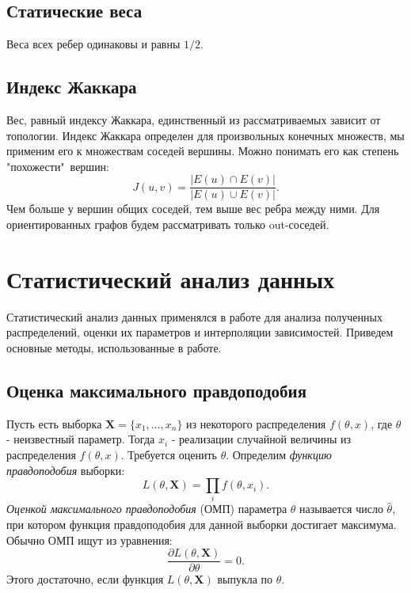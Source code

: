 \subsection{Статические веса}
Веса всех ребер одинаковы и равны $1/2$.

\subsection{Индекс Жаккара}
Вес, равный индексу Жаккара, единственный из рассматриваемых зависит от топологии. Индекс Жаккара определен для произвольных конечных множеств, мы применим его к множествам соседей вершины. Можно понимать его как степень "похожести"\ вершин:
\begin{equation}
J(u,v)=\frac{|E(u)\cap E(v)|}{|E(u)\cup E(v)|}.
\end{equation}
Чем больше у вершин общих соседей, тем выше вес ребра между ними. Для ориентированных графов будем рассматривать только out-соседей.


\section{Статистический анализ данных}
Статистический анализ данных применялся в работе для анализа полученных распределений, оценки их параметров и интерполяции зависимостей. Приведем основные методы, использованные в работе.

\subsection{Оценка максимального правдоподобия}
Пусть есть выборка $\mathbf{X}=\{x_1,\dots, x_n\}$ из некоторого распределения $f(\theta, x)$, где $\theta$ - неизвестный параметр. Тогда $x_i$ - реализации случайной величины из распределения $f(\theta, x)$. Требуется оценить $\theta$. Определим \textit{функцию правдоподобия} выборки:
\begin{equation}
L(\theta, \mathbf{X})=\prod_{i} f(\theta, x_i). 
\end{equation}
\textit{Оценкой максимального правдоподобия} (ОМП) параметра $\theta$ называется число $\hat{\theta}$, при котором функция правдоподобия для данной выборки достигает максимума.\\

Обычно ОМП ищут из уравнения:
\begin{equation}
\frac{\partial L(\theta, \mathbf{X})}{\partial \theta} = 0.
\end{equation}
Этого достаточно, если функция $L(\theta, \mathbf{X})$ выпукла по $\theta$.\\

